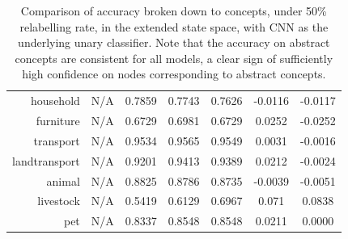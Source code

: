 \documentclass[11pt,a4paper]{book}
\begin{document}
\begin{table}[htbp]
\begin{tabular}{r|c|c|c|c|c|c}
household     & N/A    & 0.7859 & 0.7743 & 0.7626 & -0.0116 & -0.0117\\
furniture     & N/A    & 0.6729 & 0.6981 & 0.6729 & 0.0252 & -0.0252\\
transport     & N/A    & 0.9534 & 0.9565 & 0.9549 & 0.0031 & -0.0016\\
landtransport & N/A    & 0.9201 & 0.9413 & 0.9389 & 0.0212 & -0.0024\\
animal        & N/A    & 0.8825 & 0.8786 & 0.8735 & -0.0039 & -0.0051\\
livestock     & N/A    & 0.5419 & 0.6129 & 0.6967 & 0.071 & 0.0838\\
pet           & N/A    & 0.8337 & 0.8548 & 0.8548 & 0.0211 & 0.0000
\end{tabular}
\caption{Comparison of accuracy broken down to concepts, under 50\% relabelling rate, in the extended state space, with CNN as the underlying unary classifier. Note that the accuracy on abstract concepts are consistent for all models, a clear sign of sufficiently high confidence on nodes corresponding to abstract concepts.}
\label{tab:cnn50acc}
\end{table}
\end{document}
